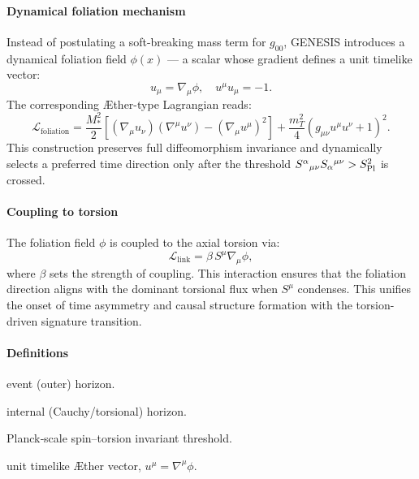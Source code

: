 \documentclass{article}
\newcommand{\Splanck}{S_{\mathrm{Pl}}}
\begin{document}
\paragraph{Dynamical foliation mechanism}
Instead of postulating a soft-breaking mass term for $g_{00}$, GENESIS introduces a dynamical foliation field $\phi(x)$ — a scalar whose gradient defines a unit timelike vector:
\[
  u_\mu = \nabla_\mu \phi,
  \quad u^\mu u_\mu = -1.
\]
The corresponding Æther-type Lagrangian reads:
\[
  \mathcal{L}_{\text{foliation}} = \frac{M_*^2}{2} \left[ (\nabla_\mu u_\nu)(\nabla^\mu u^\nu) - (\nabla_\mu u^\mu)^2 \right] + \frac{m_T^2}{4} \left(g_{\mu\nu} u^\mu u^\nu + 1\right)^2.
\]
This construction preserves full diffeomorphism invariance and dynamically selects a preferred time direction only after the threshold $S^\alpha{}_{\mu\nu} S_\alpha{}^{\mu\nu} > S_{\rm Pl}^2$ is crossed.

\paragraph{Coupling to torsion}
The foliation field $\phi$ is coupled to the axial torsion via:
\[
  \mathcal{L}_{\text{link}} = \beta\, S^\mu \nabla_\mu \phi,
\]
where $\beta$ sets the strength of coupling. This interaction ensures that the foliation direction aligns with the dominant torsional flux when $S^\mu$ condenses. This unifies the onset of time asymmetry and causal structure formation with the torsion-driven signature transition.

\paragraph{Definitions}
\begin{description}[leftmargin=2em]
  \item[$r_+$] event (outer) horizon.
  \item[$r_-$] internal (Cauchy/torsional) horizon.
  \item[$S^2 \sim \Splanck^2$] Planck‐scale spin–torsion invariant threshold.
  \item[$u_\mu$] unit timelike Æther vector, $u^\mu = \nabla^\mu \phi$.
\end{description}
\end{document}

